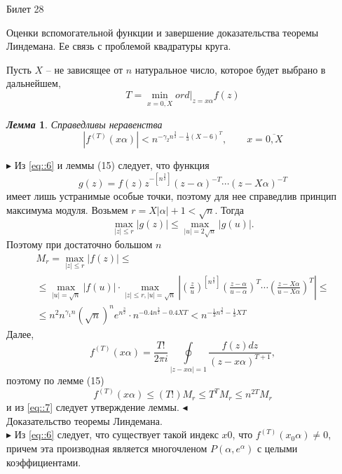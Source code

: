 \documentclass[a4paper,12pt]{article}
\newtheorem{lem}{\textit{Лемма}}
\newcommand{\AL}{\alpha}
\newcommand{\q}{\quad}
\newcommand{\pb}{\blacktriangleright}
\newcommand{\pe}{\blacktriangleleft}
\newcommand{\os}{\left(}
\newcommand{\cs}{\right)}
\begin{document}
\newpage
\begin{mybox2}{\hypertarget{bil28}{Билет 28}}

\begin{formbox}{}
Оценки вспомогательной функции и завершение доказательства теоремы Линдемана. Ее связь с проблемой квадратуры круга.
\end{formbox}
Пусть $X$ -- не зависящее от $n$ натуральное число, которое будет выбрано в дальнейшем, 
\begin{equation}
T = \min\limits_{x = \overline{0,X}} ord|_{z = x\AL} f(z) \label{eq::6}
\end{equation}
\begin{formbox}{}
\begin{lem} Справедливы неравенства
\[|f^{(T)}(x\AL)|  < n^{-\gamma_2 n^{\frac{3}{2}} - \frac{1}{3} (X-6)^T},\q\q x = \overline{0,X}\]
\end{lem}
\end{formbox}
$\pb$ Из \ref{eq::6} и леммы (15) следует, что функция
\[g(z) = f(z)z^{-[n^{\frac{3}{2}}]}(z -\AL)^{-T}\cdots(z - X\AL)^{-T}\]
имеет лишь устранимые особые точки, поэтому для нее справедлив принцип максимума модуля. Возьмем \(r = X|\AL| + 1 < \sqrt{n}\). Тогда \[\max\limits_{|z|\le r} |g(z)| \le \max\limits_{|u|=2\sqrt{n}}|g(u)|.\]
Поэтому при достаточно большом $n$ 
\begin{equation}
\begin{split}
M_r = \max\limits_{|z|\le r} |f(z)|\le\\
\le \max\limits_{|u| = \sqrt{n}} |f(u)|\cdot \max_{|z|\le r, |u| = \sqrt{n}} \left| \left( \frac{z}{u}  \right)^{[n^\frac{3}{2}]} \os \frac{z-\AL}{u-\AL}  \cs^T\cdots \os  \frac{z-X\AL}{u-X\AL} \cs^T \right| \le\\
\le n^2n^{\gamma_1n}(\sqrt{n})^ne^{n^{\frac{3}{2}}} \cdot n^{-0.4n^\frac{3}{2} - 0.4XT} < n^{-\frac{1}{3} n^\frac{3}{2} - \frac{1}{3}XT}
\label{eq::7}
\end{split}
\end{equation}
Далее, \[f^{(T)}(x\AL) = \frac{T!}{2\pi i}\oint\limits_{|z-x\AL|=1} \frac{f(z)dz}{(z -x\AL)^{T+1}},\]
поэтому по лемме (15) \[f^{(T)}(x\AL) \le  (T!)M_r \le T^TM_r \le n^{2T}M_r\]
и из \ref{eq::7} следует утверждение леммы. $\pe$\\

Доказательство теоремы Линдемана. \\
$\pb$ Из \ref{eq::6} следует, что существует такой индекс \(x0\), что \(f^{(T)}
(x_0\AL) \not= 0\), причем эта производная является многочленом $P(\AL, e^\AL)$ с целыми коэффициентами.

\end{mybox2}
\end{document}
